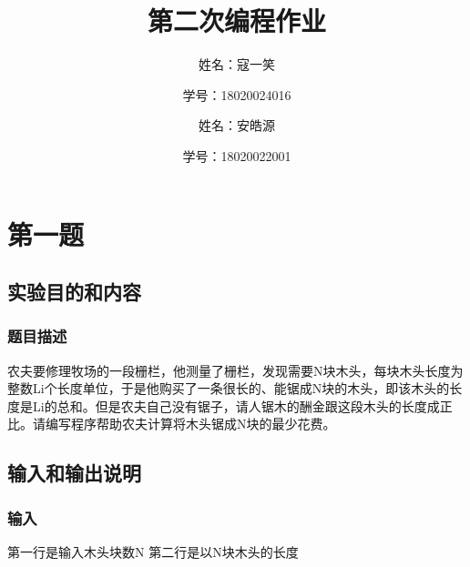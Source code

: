 \documentclass[UTF8]{ctexart}
\title{第二次编程作业}
\author{姓名：寇一笑 \\
\and 学号：18020024016\\
\and 姓名：安皓源 \\
\and 学号：18020022001\\
}
\begin{document}
	\maketitle
	\renewcommand{\contentsname}{Contents}
	\tableofcontents
	\newpage
	
	\hypersetup{
	bookmarks=true,
	colorlinks=true,
	linkcolor=red,
	urlcolor=blue
	}
\section{第一题}
	\subsection{实验目的和内容}
	\subsubsection{题目描述}
    农夫要修理牧场的一段栅栏，他测量了栅栏，发现需要N块木头，每块木头长度为整数Li个长度单位，于是他购买了一条很长的、能锯成N块的木头，即该木头的长度是Li的总和。但是农夫自己没有锯子，请人锯木的酬金跟这段木头的长度成正比。请编写程序帮助农夫计算将木头锯成N块的最少花费。


\subsection{输入和输出说明}
	\subsubsection{输入}
    \indent 第一行是输入木头块数N
    \indent 第二行是以N块木头的长度


\end{document}
